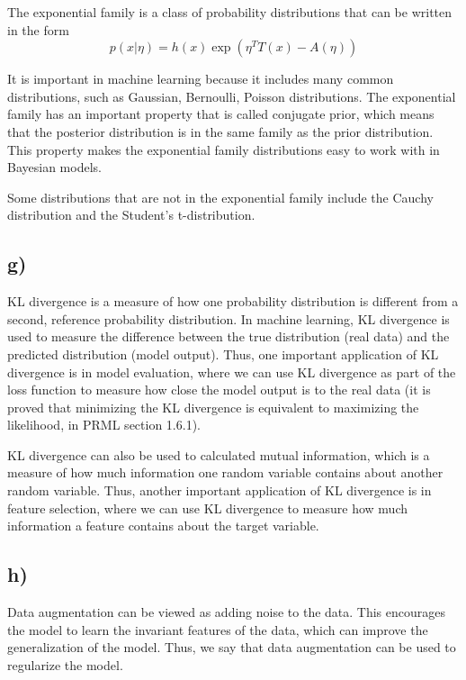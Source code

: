 \documentclass[a4paper,12pt]{article}
\begin{document}
The exponential family is a class of probability distributions that can be written in the form
\begin{equation*}
	p(x|\eta) = h(x) \exp(\eta^T T(x) - A(\eta))
\end{equation*}

It is important in machine learning because it includes many common distributions, such as Gaussian, Bernoulli, Poisson distributions. The exponential family has an important property that is called conjugate prior, which means that the posterior distribution is in the same family as the prior distribution. This property makes the exponential family distributions easy to work with in Bayesian models.

Some distributions that are not in the exponential family include the Cauchy distribution and the Student's t-distribution.

\subsection*{g)}

KL divergence is a measure of how one probability distribution is different from a second, reference probability distribution. In machine learning, KL divergence is used to measure the difference between the true distribution (real data) and the predicted distribution (model output). Thus, one important application of KL divergence is in model evaluation, where we can use KL divergence as part of the loss function to measure how close the model output is to the real data (it is proved that minimizing the KL divergence is equivalent to maximizing the likelihood, in PRML section 1.6.1).

KL divergence can also be used to calculated mutual information, which is a measure of how much information one random variable contains about another random variable. Thus, another important application of KL divergence is in feature selection, where we can use KL divergence to measure how much information a feature contains about the target variable.

\subsection*{h)}

Data augmentation can be viewed as adding noise to the data. This encourages the model to learn the invariant features of the data, which can improve the generalization of the model. Thus, we say that data augmentation can be used to regularize the model.
\end{document}
